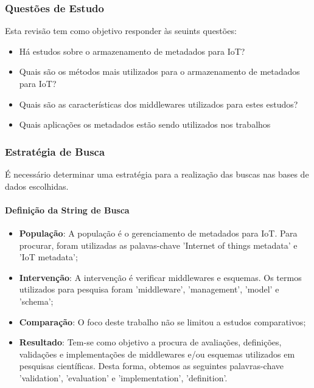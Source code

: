 \subsubsection{Questões de Estudo}
Esta revisão tem como objetivo responder às seuints questões:
\begin{itemize}
  \item Há estudos sobre o armazenamento de metadados para \acrlong{IoT}?
  \item Quais são os métodos mais utilizados para o armazenamento de metadados para \acrshort{IoT}?
  \item Quais são as características dos middlewares utilizados para estes estudos?
  \item Quais aplicações os metadados estão sendo utilizados nos trabalhos
\end{itemize}

\subsubsection{Estratégia de Busca}
É necessário determinar uma estratégia para a realização das buscas nas bases de dados escolhidas.

\paragraph{Definição da String de Busca}
\begin{itemize}
  \item \textbf{População}: A população é o gerenciamento de metadados para \acrshort{IoT}. Para procurar, foram utilizadas as palavas-chave 'Internet of things metadata' e 'IoT metadata';
  \item \textbf{Intervenção}: A intervenção é verificar middlewares e esquemas. Os termos utilizados para pesquisa foram 'middleware', 'management', 'model' e 'schema';
  \item \textbf{Comparação}: O foco deste trabalho não se limitou a estudos comparativos;
  \item \textbf{Resultado}: Tem-se como objetivo a procura de avaliações, definições, validações e implementações de middlewares e/ou esquemas utilizados em pesquisas científicas. Desta forma, obtemos as seguintes palavras-chave
  'validation', 'evaluation' e 'implementation', 'definition'.
\end{itemize}

